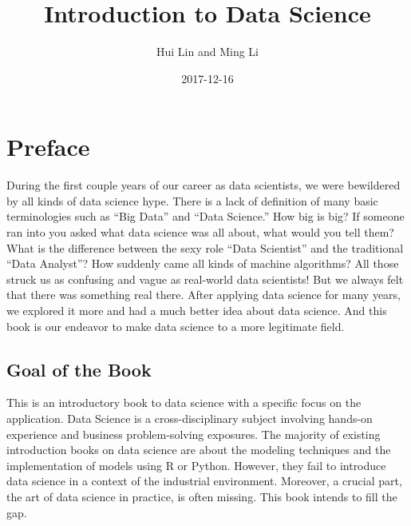 \documentclass[12pt,]{krantz}
\title{Introduction to Data Science}
\author{Hui Lin and Ming Li}
\date{2017-12-16}
\theoremstyle{definition}
\theoremstyle{definition}
\theoremstyle{remark}
\begin{document}
\maketitle

\thispagestyle{empty}
\begin{center}
\end{center}

\setlength{\abovedisplayskip}{-5pt}
\setlength{\abovedisplayshortskip}{-5pt}

{
\hypersetup{linkcolor=black}
\setcounter{tocdepth}{2}
\tableofcontents
}
\listoftables
\listoffigures
\chapter*{Preface}\label{preface}


During the first couple years of our career as data scientists, we were
bewildered by all kinds of data science hype. There is a lack of
definition of many basic terminologies such as ``Big Data'' and ``Data
Science.'' How big is big? If someone ran into you asked what data
science was all about, what would you tell them? What is the difference
between the sexy role ``Data Scientist'' and the traditional ``Data
Analyst''? How suddenly came all kinds of machine algorithms? All those
struck us as confusing and vague as real-world data scientists! But we
always felt that there was something real there. After applying data
science for many years, we explored it more and had a much better idea
about data science. And this book is our endeavor to make data science
to a more legitimate field.

\section*{Goal of the Book}\label{goal-of-the-book}


This is an introductory book to data science with a specific focus on
the application. Data Science is a cross-disciplinary subject involving
hands-on experience and business problem-solving exposures. The majority
of existing introduction books on data science are about the modeling
techniques and the implementation of models using R or Python. However,
they fail to introduce data science in a context of the industrial
environment. Moreover, a crucial part, the art of data science in
practice, is often missing. This book intends to fill the gap.
\end{document}
